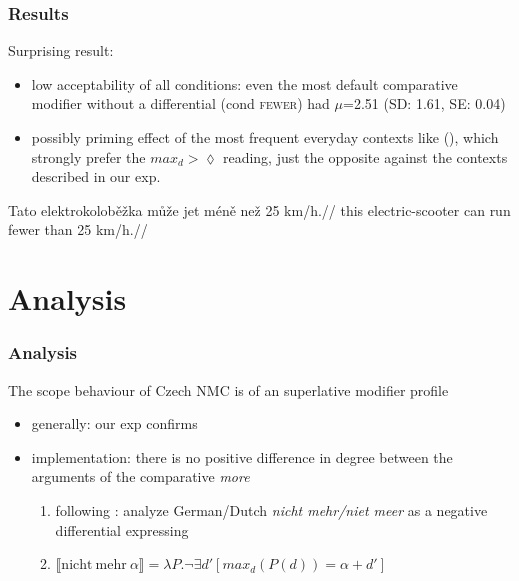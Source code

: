 \documentclass[10pt
]{beamer}
\newcommand{\cond}[1]{\textsc{#1}}
\newcommand{\sem}[1]{\llbracket{#1}\rrbracket}
\begin{document}
\begin{frame}
  \frametitle{Results}

  Surprising result:
  
  \begin{itemize}
    \item low acceptability of all conditions: even the most default comparative modifier without a differential (cond \cond{fewer}) had $\mu$=2.51 (SD: 1.61, SE: 0.04)
    \item possibly priming effect of the most frequent everyday contexts like (\nextx), which strongly prefer the $max_d > \lozenge$ reading, just the opposite against the contexts described in our exp. 

  \end{itemize}

\ex 
\begingl
\gla Tato elektrokoloběžka může jet méně než 25 km/h.//
\glb this electric-scooter can run fewer than 25 km/h.//
\endgl
\xe

\end{frame}

\section{Analysis}

\begin{frame}
  \frametitle{Analysis}

  The scope behaviour of Czech NMC is of an superlative modifier profile
  
  \begin{itemize}
    \item generally: our exp confirms \cite{kennedy2015fregean}
    \item implementation:  there is no positive difference in degree between the arguments of the comparative \textit{more}
    
    \begin{enumerate}
      \item following \cite{nouwen2008upper}: analyze German/Dutch \textit{nicht mehr/niet meer} as a negative differential expressing  
      \item $\sem{\mathrm{nicht\ mehr\ }\alpha}=\lambda P.\neg \exists d'[max_d(P(d)) = \alpha + d']$ 
    \end{enumerate}

  \end{itemize}
  
\end{frame}
\end{document}
